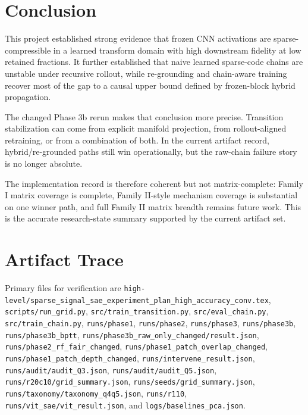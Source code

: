 \documentclass[11pt]{article}
\begin{document}
\section{Conclusion}
This project established strong evidence that frozen CNN activations are sparse-compressible in a learned transform domain with high downstream fidelity at low retained fractions. It further established that naive learned sparse-code chains are unstable under recursive rollout, while re-grounding and chain-aware training recover most of the gap to a causal upper bound defined by frozen-block hybrid propagation.

The changed Phase 3b rerun makes that conclusion more precise. Transition stabilization can come from explicit manifold projection, from rollout-aligned retraining, or from a combination of both. In the current artifact record, hybrid/re-grounded paths still win operationally, but the raw-chain failure story is no longer absolute.

The implementation record is therefore coherent but not matrix-complete: Family I matrix coverage is complete, Family II-style mechanism coverage is substantial on one winner path, and full Family II matrix breadth remains future work. This is the accurate research-state summary supported by the current artifact set.

\section*{Artifact Trace}
Primary files for verification are \texttt{high-level/sparse\_signal\_sae\_experiment\_plan\_high\_accuracy\_conv.tex}, \texttt{scripts/run\_grid.py}, \texttt{src/train\_transition.py}, \texttt{src/eval\_chain.py}, \texttt{src/train\_chain.py}, \texttt{runs/phase1}, \texttt{runs/phase2}, \texttt{runs/phase3}, \texttt{runs/phase3b}, \texttt{runs/phase3b\_bptt}, \texttt{runs/phase3b\_raw\_only\_changed/result.json}, \texttt{runs/phase2\_rf\_fair\_changed}, \texttt{runs/phase1\_patch\_overlap\_changed}, \texttt{runs/phase1\_patch\_depth\_changed}, \texttt{runs/intervene\_result.json}, \texttt{runs/audit/audit\_Q3.json}, \texttt{runs/audit/audit\_Q5.json}, \texttt{runs/r20c10/grid\_summary.json}, \texttt{runs/seeds/grid\_summary.json}, \texttt{runs/taxonomy/taxonomy\_q4q5.json}, \texttt{runs/r110}, \texttt{runs/vit\_sae/vit\_result.json}, and \texttt{logs/baselines\_pca.json}.
\end{document}

